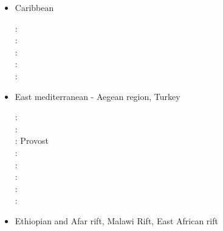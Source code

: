 \begin{itemize}
\begin{scriptsize}
\nineteenninetytwo: \cite{chou92}\\
\nineteenninetythree: \cite{qubh93}\\
\nineteenninetyeight: \cite{giju98}\\
\twothousand: \cite{bemh00}\\
\twothousandfour: \cite{mcmg04}\cite{siss04}\\
\twothousandten: \cite{jaml10}\\
\twothousandtwelve: \cite{vime12}\\
\twothousandthirteen: \cite{fihv13b}\\
\twothousandfourteen: \cite{jahm14}\\
\twothousandnineteen: \cite{dual19}, Jourdon \etal \cite{jolm19}
\end{scriptsize}

\item{Caribbean} 

\begin{scriptsize}
\twothousandten: \cite{vago10}\\
\twothousandthirteen: \cite{vags13}\\
\twothousandfourteen: \cite{bovt14}\cite{vagw14}\cite{necb14}\\
\twothousandfifteen: \cite{homi15}\cite{necb15}\\
\twothousandtwenty: \cite{phvb20}\cite{mugu20}
\end{scriptsize}

\item{East mediterranean - Aegean region, Turkey} 
\begin{scriptsize}
\nineteenseventyeight: \cite{mcke78b}\\
\nineteenninetynine: \cite{gabm99}\\
\twothousandthree: Provost \etal \cite{prch03}\\
\twothousandten: \cite{cazf10}\\
\twothousandeleven: \cite{enlm11}\\
\twothousandthirteen: \cite{jofh13}\\
\twothousandseventeen: \cite{ozgw17}\\
\twothousandtwenty: \cite{rohb20}\cite{femb20}
\end{scriptsize}

\item{Ethiopian and Afar rift, Malawi Rift, East African rift} 


\end{itemize}
